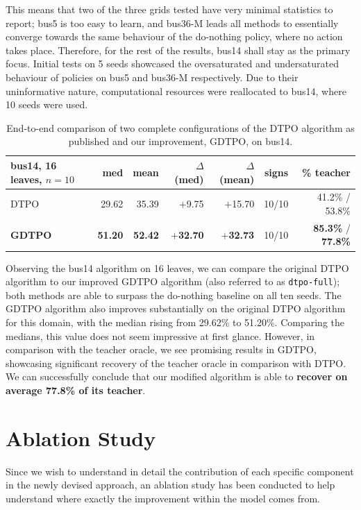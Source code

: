 This means that two of the three grids tested have very minimal statistics to report; bus5 is too easy to learn, and bus36-M leads all methods to essentially converge towards the same behaviour of the do-nothing policy, where no action takes place. Therefore, for the rest of the results, bus14 shall stay as the primary focus. Initial tests on 5 seeds showcased the oversaturated and undersaturated behaviour of policies on bus5 and bus36-M respectively. Due to their uninformative nature, computational resources were reallocated to bus14, where 10 seeds were used.

\begin{table}[H]
\centering
\small
\begin{tabular}{lrrrrrr}
\toprule
bus14, 16 leaves, $n=10$ & med & mean & $\Delta$ (med) & $\Delta$ (mean) & signs & \% teacher \\
\midrule
DTPO & 29.62 & 35.39 & $+$9.75 & $+$15.70 & 10/10 & 41.2\% / 53.8\% \\
\textbf{GDTPO} & \textbf{51.20} & \textbf{52.42} & \textbf{$+$32.70} & \textbf{$+$32.73} & 10/10 & \textbf{85.3\%} / \textbf{77.8\%} \\
\bottomrule
\end{tabular}
\caption{End-to-end comparison of two complete configurations of the DTPO algorithm as published and our improvement, GDTPO, on bus14.}
\label{tab:endtoend}
\end{table}

Observing the bus14 algorithm on 16 leaves, we can compare the original DTPO algorithm to our improved GDTPO algorithm (also referred to as \texttt{dtpo-full}); both methods are able to surpass the do-nothing baseline on all ten seeds. The GDTPO algorithm also improves substantially on the original DTPO algorithm for this domain, with the median rising from 29.62\% to 51.20\%. Comparing the medians, this value does not seem impressive at first glance. However, in comparison with the teacher oracle, we see promising results in GDTPO, showcasing significant recovery of the teacher oracle in comparison with DTPO. We can successfully conclude that our modified algorithm is able to \textbf{recover on average 77.8\% of its teacher}.

\section{Ablation Study}

\label{sec:ablation}

Since we wish to understand in detail the contribution of each specific component in the newly devised approach, an ablation study has been conducted to help understand where exactly the improvement within the model comes from. 

